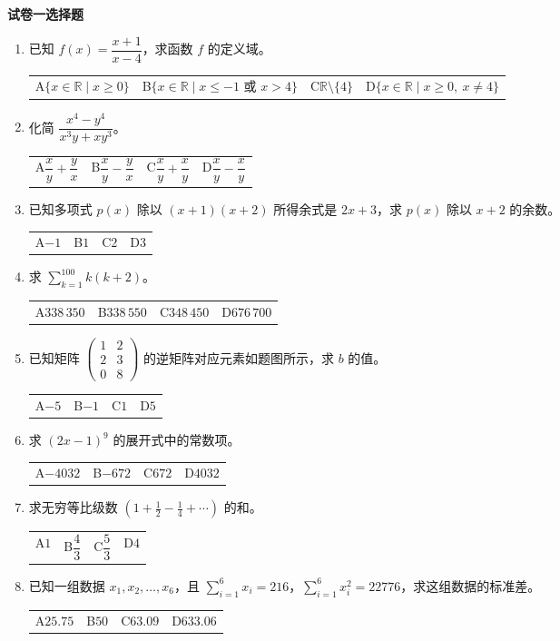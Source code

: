 \documentclass[12pt,a4paper]{exam-zh}
\makeatletter
\newcommand{\optline}[4]{%
  \begin{tabular*}{\linewidth}{@{\extracolsep{\fill}}llll}
  A\;#1 & B\;#2 & C\;#3 & D\;#4
  \end{tabular*}}
\makeatother
\begin{document}
\begin{center}
  {\bfseries 试卷一\quad 选择题}
\end{center}
\begin{enumerate}[leftmargin=2.2em,label=\arabic*.]
\item 已知 $f(x)=\dfrac{x+1}{x-4}$，求函数 $f$ 的定义域。\\
\optline{$\{x\in\mathbb R\mid x\ge 0\}$}{$\{x\in\mathbb R\mid x\le -1\text{ 或 }x>4\}$}{$\mathbb R\setminus\{4\}$}{$\{x\in\mathbb R\mid x\ge 0,\ x\ne 4\}$}

\item 化简 $\dfrac{x^4-y^4}{x^3y+xy^3}$。\\
\optline{$\dfrac{x}{y}+\dfrac{y}{x}$}{$\dfrac{x}{y}-\dfrac{y}{x}$}{$\dfrac{x}{y}+\dfrac{x}{y}$}{$\dfrac{x}{y}-\dfrac{x}{y}$}

\item 已知多项式 $p(x)$ 除以 $(x+1)(x+2)$ 所得余式是 $2x+3$，求 $p(x)$ 除以 $x+2$ 的余数。\\
\optline{$-1$}{$1$}{$2$}{$3$}

\item 求 $\displaystyle \sum_{k=1}^{100} k(k+2)$。\\
\optline{$338\,350$}{$338\,550$}{$348\,450$}{$676\,700$}

\item 已知矩阵 $\begin{pmatrix}1&2\\2&3\\0&8\end{pmatrix}$ 的逆矩阵对应元素如题图所示，求 $b$ 的值。\\
\optline{$-5$}{$-1$}{$1$}{$5$}

\item 求 $(2x-1)^9$ 的展开式中的常数项。\\
\optline{$-4032$}{$-672$}{$672$}{$4032$}

\item 求无穷等比级数 $(1+\tfrac12-\tfrac14+\cdots)$ 的和。\\
\optline{$1$}{$\dfrac43$}{$\dfrac53$}{$4$}

\item 已知一组数据 $x_1,x_2,\ldots,x_6$，且 $\sum_{i=1}^6 x_i=216$，$\sum_{i=1}^6 x_i^2=22776$，求这组数据的标准差。\\
\optline{$25.75$}{$50$}{$63.09$}{$633.06$}
\end{enumerate}

\newpage
\end{document}
